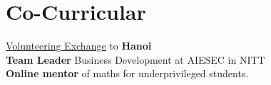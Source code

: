 \documentclass[]{deedy-resume-openfont}
\begin{document}
\begin{minipage}[t]{0.31\textwidth}

\section{Co-Curricular}
\textbullet{} \href{https://drive.google.com/file/d/1vIy0pa7z22vhjB0MadnEut0ej8C5hDI0/view}{Volunteering Exchange} to \textbf{Hanoi} \\
\textbullet{} \textbf{Team Leader} Business Development at AIESEC in NITT \\
\textbullet{} \textbf{Online mentor} of maths for underprivileged students. \\
\sectionsep


%
%

\end{minipage} 
\hfill
\end{document}
